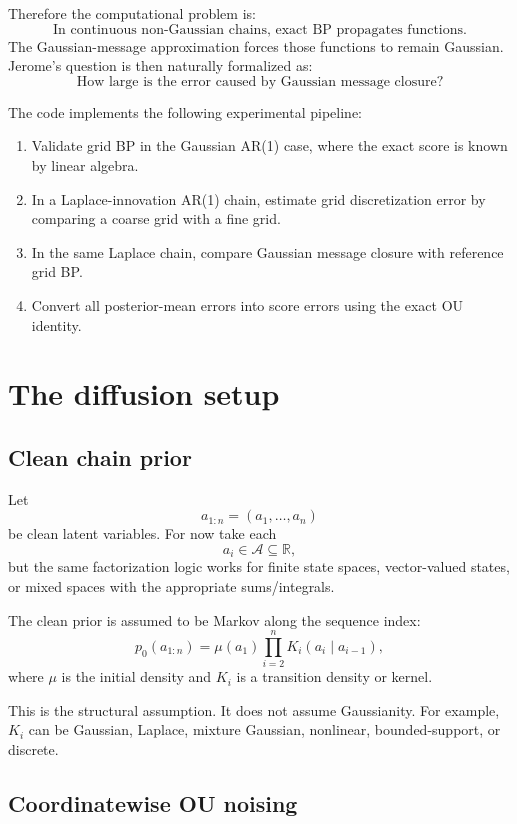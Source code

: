 \documentclass[11pt]{article}
\newcommand{\R}{\mathbb{R}}
\begin{document}
Therefore the computational problem is:
\[
\boxed{\text{In continuous non-Gaussian chains, exact BP propagates functions.}}
\]
The Gaussian-message approximation forces those functions to remain Gaussian. Jerome's question is then naturally formalized as:
\[
\boxed{\text{How large is the error caused by Gaussian message closure?}}
\]

The code implements the following experimental pipeline:
\begin{enumerate}[label=\arabic*.]
  \item Validate grid BP in the Gaussian AR(1) case, where the exact score is known by linear algebra.
  \item In a Laplace-innovation AR(1) chain, estimate grid discretization error by comparing a coarse grid with a fine grid.
  \item In the same Laplace chain, compare Gaussian message closure with reference grid BP.
  \item Convert all posterior-mean errors into score errors using the exact OU identity.
\end{enumerate}

\section{The diffusion setup}

\subsection{Clean chain prior}

Let
\[
  a_{1:n}=(a_1,\ldots,a_n)
\]
be clean latent variables. For now take each
\[
  a_i\in\mathcal A\subseteq \R,
\]
but the same factorization logic works for finite state spaces, vector-valued states, or mixed spaces with the appropriate sums/integrals.

The clean prior is assumed to be Markov along the sequence index:
\begin{equation}
  p_0(a_{1:n})
  = \mu(a_1)\prod_{i=2}^n K_i(a_i\mid a_{i-1}),
  \label{eq:markov-prior}
\end{equation}
where \(\mu\) is the initial density and \(K_i\) is a transition density or kernel.

This is the structural assumption. It does not assume Gaussianity. For example, \(K_i\) can be Gaussian, Laplace, mixture Gaussian, nonlinear, bounded-support, or discrete.

\subsection{Coordinatewise OU noising}
\end{document}
